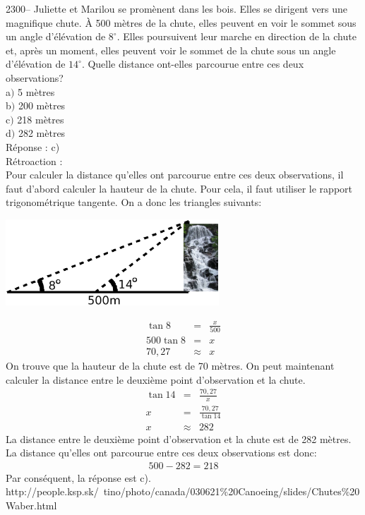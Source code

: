 \documentclass[letterpaper, 12pt]{article}
\begin{document}
2300-- Juliette et Marilou se prom\`enent dans les bois. Elles se dirigent vers une magnifique chute. \`A 500 m\`etres de la chute, elles peuvent en voir le sommet sous un angle d'\'el\'evation de $8^{\circ}$. Elles poursuivent leur marche en direction de la chute et, apr\`es un moment, elles peuvent voir le sommet de la chute sous un angle d'\'el\'evation de $14^{\circ}$. Quelle distance ont-elles parcourue entre ces deux observations?\\

a$)$ 5 m\`etres\\
b$)$ 200 m\`etres\\
c$)$ 218 m\`etres\\
d$)$ 282 m\`etres\\

R\'eponse : c)\\

R\'etroaction :\\
Pour calculer la distance qu'elles ont parcourue entre ces deux observations, il faut d'abord calculer la hauteur de la chute. Pour cela, il faut utiliser le rapport trigonom\'etrique tangente. On a donc les triangles suivants:
\begin{center}
 \includegraphics[width=8cm,bb=14 14 845 315]{Q2300chutes.eps}
\end{center}
\begin{eqnarray*}
\tan{8}&=&\frac{x}{500}\\[2mm]
500\tan{8}&=&x\\[2mm]
70,27&\approx&x
\end{eqnarray*}
On trouve que la hauteur de la chute est de 70 m\`etres. On peut maintenant calculer la distance entre le deuxi\`eme point d'observation et la chute.
\begin{eqnarray*}
\tan{14}&=&\frac{70,27}{x}\\[2mm]
x&=&\frac{70,27}{\tan{14}}\\[2mm]
x&\approx&282
\end{eqnarray*}
La distance entre le deuxi\`eme point d'observation et la chute est de 282 m\`etres. La distance qu'elles ont parcourue entre ces deux observations est donc:
\begin{eqnarray*}
500-282=218
\end{eqnarray*}
Par cons\'equent, la r\'eponse est c).\\
http://people.ksp.sk/~tino/photo/canada/030621\%20Canoeing/slides/Chutes\%20Waber.html\\
\end{document}

